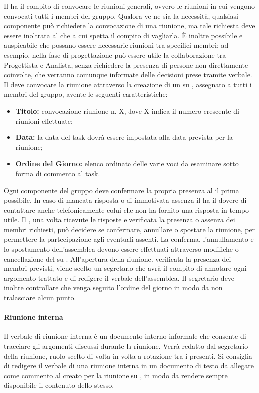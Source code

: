 \documentclass[12pt,a4paper]{article}
\begin{document}
Il \PM{} ha il compito di convocare le riunioni generali, ovvero le riunioni in cui vengono convocati tutti i membri del gruppo.
Qualora ve ne sia la necessità, qualsiasi componente può richiedere la convocazione di una riunione, ma tale richiesta deve essere inoltrata al \PM{} che a cui spetta il compito di vagliarla. È inoltre possibile e auspicabile che possano essere necessarie riunioni tra specifici membri: ad esempio, nella fase di progettazione può essere utile la collaborazione tra Progettista e Analista, senza richiedere la presenza di persone non direttamente coinvolte, che verranno comunque informate delle decisioni prese tramite verbale.
Il \PM{} deve convocare la riunione attraverso la creazione di un \textit{} su \textit{}, assegnato a tutti i membri del gruppo, avente le seguenti caratteristiche:
\begin{itemize}
  \item \textbf{Titolo:} convocazione riunione n. X, dove X indica il numero crescente di riunioni effettuate;
  \item \textbf{Data:} la data del task dovrà essere impostata alla data prevista per la riunione;
  \item \textbf{Ordine del Giorno:} elenco ordinato delle varie voci da esaminare sotto forma di commento al task.
\end{itemize}
Ogni componente del gruppo deve confermare la propria presenza al \PM{} il prima possibile. 
In caso di mancata risposta o di immotivata assenza il \PM{} ha il dovere di contattare anche telefonicamente colui che non ha fornito una risposta in tempo utile. Il \PM{}, una volta ricevute le risposte e verificata la presenza o assenza dei membri richiesti, può decidere se confermare, annullare o spostare la riunione, per permettere la partecipazione agli eventuali assenti. La conferma, l'annullamento e lo spostamento dell'assemblea devono essere effettuati attraverso modifiche o cancellazione del  su .
All'apertura della riunione, verificata la presenza dei membri previsti, viene scelto un segretario che avrà il compito di annotare ogni argomento trattato e di redigere il verbale dell'assemblea.
Il segretario deve inoltre controllare che venga seguito l'ordine del giorno in modo da non tralasciare alcun punto.

\paragraph{Riunione interna}
Il verbale di riunione interna è un documento interno informale che consente di tracciare gli argomenti discussi durante la riunione. Verrà redatto dal segretario della riunione, ruolo scelto di volta in volta a rotazione tra i presenti. Si consiglia di redigere il verbale di una riunione interna in un documento di testo da allegare come commento al  creato per la riunione su , in modo da rendere sempre disponibile il contenuto dello stesso.
\end{document}
